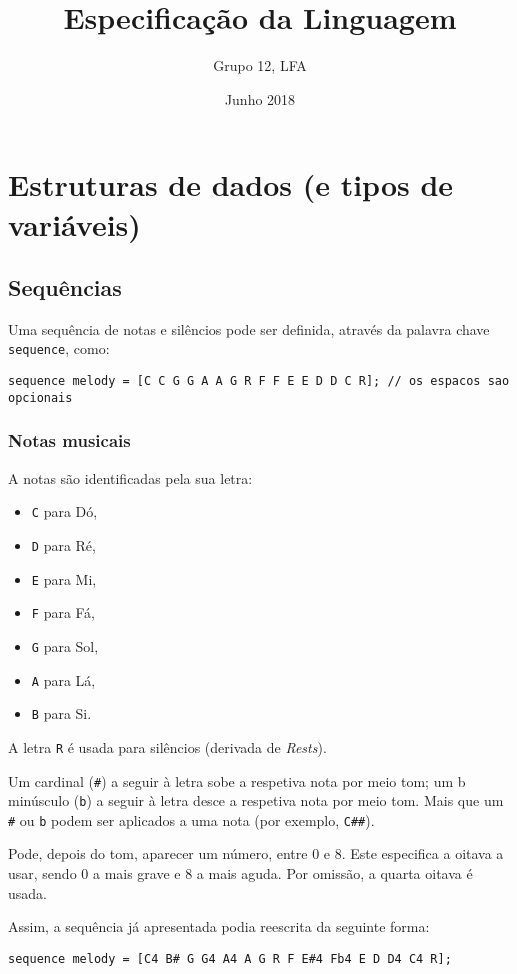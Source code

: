 \documentclass{article}
\title{Especificação da Linguagem}
\author{Grupo 12, LFA}
\date{Junho 2018}
\begin{document}
\maketitle

\tableofcontents
\clearpage

\section{Estruturas de dados (e tipos de variáveis)} \label{variables}
\subsection{Sequências}
Uma sequência de notas e silêncios pode ser definida, através da palavra chave \texttt{sequence}, como:
\begin{lstlisting} 
sequence melody = [C C G G A A G R F F E E D D C R]; // os espacos sao opcionais
\end{lstlisting}

\subsubsection{Notas musicais}
A notas são identificadas pela sua letra:
\begin{itemize}
    \item \texttt{C} para Dó,
    \item \texttt{D} para Ré,
    \item \texttt{E} para Mi,
    \item \texttt{F} para Fá,
    \item \texttt{G} para Sol,
    \item \texttt{A} para Lá,
    \item \texttt{B} para Si.
\end{itemize}
A letra \texttt{R} é usada para silêncios (derivada de \textit{Rests}).

Um cardinal (\texttt{\#}) a seguir à letra sobe a respetiva nota por meio tom; um b minúsculo (\texttt{b}) a seguir à letra desce a respetiva nota por meio tom. Mais que um \texttt{\#} ou \texttt{b} podem ser aplicados a uma nota (por exemplo, \texttt{C\#\#}).

Pode, depois do tom, aparecer um número, entre 0 e 8. Este especifica a oitava a usar, sendo 0 a mais grave e 8 a mais aguda. Por omissão, a quarta oitava é usada.

Assim, a sequência já apresentada podia reescrita da seguinte forma:
\begin{lstlisting} 
sequence melody = [C4 B# G G4 A4 A G R F E#4 Fb4 E D D4 C4 R];
\end{lstlisting}
\end{document}
